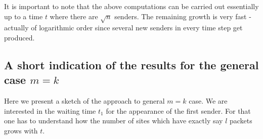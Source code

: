 It is important to note that the above computations can be carried out
essentially up to a time $t$ where there are $\sqrt{n}$ senders. The
remaining growth is very fast - actually of logarithmic order since several
new senders in every time step get produced. \vspace{-2mm}
\subsection{A short indication of the results for the general case $m=k$}
\vspace{-1mm}
% 
% 
% 
% 
% 
% 
% 
Here we present a sketch of the approach to general $m=k$ case. We are
interested in the waiting time $t_{1}$ for the appearance of the first
sender. For that one has to understand how the number of sites which have
exactly say $l$ packets grows with $t.$

